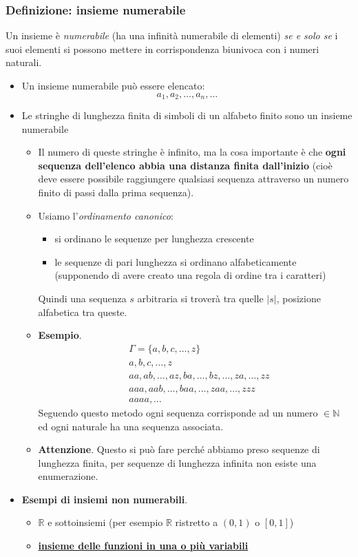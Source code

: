 \subsubsection{Definizione: insieme numerabile} Un insieme è \emph{numerabile} (ha una infinità numerabile di elementi) \emph{se e solo se} i suoi elementi si possono mettere in corrispondenza biunivoca con i numeri naturali.
\begin{itemize}
	\item Un insieme numerabile può essere elencato: \[a_1, a_2, \dots, a_n, \dots\]
	\item Le stringhe di lunghezza finita di simboli di un alfabeto finito sono un insieme numerabile
	\begin{itemize}
		\item Il numero di queste stringhe è infinito, ma la cosa importante è che \textbf{ogni sequenza dell’elenco abbia una distanza finita dall’inizio} (cioè deve essere possibile raggiungere qualsiasi sequenza attraverso un numero finito di passi dalla prima sequenza).
		
		\item Usiamo l'\emph{ordinamento canonico}:
		\begin{itemize}
			\item si ordinano le sequenze per lunghezza crescente
			\item le sequenze di pari lunghezza si ordinano alfabeticamente (supponendo di avere creato una regola di ordine tra i caratteri)
		\end{itemize}
		
		Quindi una sequenza $s$ arbitraria si troverà tra quelle $|s|$, posizione alfabetica tra queste.
		
		\item \textbf{Esempio}.
		\begin{align*}
			&\Gamma=\{a,b,c,\dots,z\}\\
			&a,b,c,\dots,z\\
			&aa,ab,\dots,az,ba,\dots,bz,\dots,za,\dots,zz\\
			&aaa,aab,\dots,baa,\dots,zaa,\dots,zzz\\
			&aaaa,\dots
		\end{align*}		
		Seguendo questo metodo ogni sequenza corrisponde ad un numero $\in \mathbb{N}$ ed ogni naturale ha una sequenza associata.
		\item \textbf{Attenzione}. Questo si può fare perché abbiamo preso sequenze di lunghezza finita, per sequenze di lunghezza infinita non esiste una enumerazione.
	\end{itemize} 
	\item \textbf{Esempi di insiemi non numerabili}.
	\begin{itemize}
		\item $\mathbb{R}$ e sottoinsiemi (per esempio $\mathbb{R}$ ristretto a $(0, 1)$ o $[0, 1]$)
		\item \underline{\textbf{insieme delle funzioni in una o più variabili}}
	\end{itemize}
\end{itemize}



